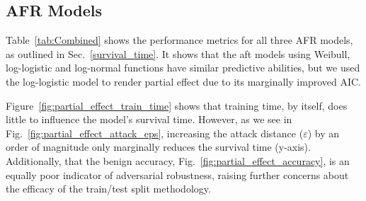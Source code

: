 \documentclass[conference]{IEEEtran}
\begin{document}
\subsection{AFR Models}

Table~\ref{tab:Combined} shows the performance metrics for all three AFR models, as outlined in Sec.~\ref{survival_time}. It shows that the aft models using Weibull, log-logistic and log-normal functions have similar predictive abilities, but we used the log-logistic model to render partial effect due to its marginally improved AIC.



Figure~\ref{fig:partial_effect_train_time} shows that training time, by itself, does little to influence the model's survival time. However, as we see in Fig.~\ref{fig:partial_effect_attack_eps}, increasing the attack distance ($\varepsilon$) by an order of magnitude only marginally reduces the survival time (y-axis). Additionally, that the benign accuracy, Fig.~\ref{fig:partial_effect_accuracy}, is an equally poor indicator of adversarial robustness, raising further concerns about the efficacy of the train/test split methodology.

\end{document}
